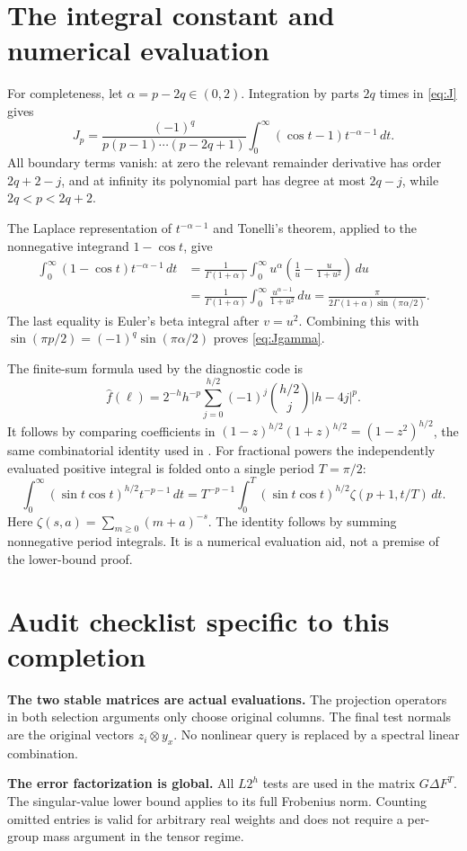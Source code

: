 \documentclass[11pt]{article}
\theoremstyle{remark}\newtheorem{remark}[theorem]{Remark}
\begin{document}
\section{The integral constant and numerical evaluation}\label{app:J}
For completeness, let $\alpha=p-2q\in(0,2)$. Integration by parts $2q$ times in \eqref{eq:J} gives
\[
 J_p=\frac{(-1)^q}{p(p-1)\cdots(p-2q+1)}
 \int_0^\infty(\cos t-1)t^{-\alpha-1}\,dt.
\]
All boundary terms vanish: at zero the relevant remainder derivative has order $2q+2-j$, and at infinity its polynomial part has degree at most $2q-j$, while $2q<p<2q+2$.

The Laplace representation of $t^{-\alpha-1}$ and Tonelli's theorem, applied to the nonnegative integrand $1-\cos t$, give
\begin{align*}
 \int_0^\infty(1-\cos t)t^{-\alpha-1}\,dt
 &=\frac1{\Gamma(1+\alpha)}
 \int_0^\infty u^{\alpha}\left(\frac1u-\frac{u}{1+u^2}\right)\,du\\
 &=\frac1{\Gamma(1+\alpha)}\int_0^\infty\frac{u^{\alpha-1}}{1+u^2}\,du
 =\frac\pi{2\Gamma(1+\alpha)\sin(\pi\alpha/2)}.
\end{align*}
The last equality is Euler's beta integral after $v=u^2$. Combining this with
$\sin(\pi p/2)=(-1)^q\sin(\pi\alpha/2)$ proves \eqref{eq:Jgamma}.

The finite-sum formula used by the diagnostic code is
\[
 \widehat f(\ell)=2^{-h}h^{-p}
 \sum_{j=0}^{h/2}(-1)^j\binom{h/2}{j}|h-4j|^p.
\]
It follows by comparing coefficients in
$(1-z)^{h/2}(1+z)^{h/2}=(1-z^2)^{h/2}$, the same combinatorial identity used in \cite{lww}. For fractional powers the independently evaluated positive integral is folded onto a single period $T=\pi/2$:
\[
 \int_0^\infty(\sin t\cos t)^{h/2}t^{-p-1}\,dt
 =T^{-p-1}\int_0^T(\sin t\cos t)^{h/2}
       \zeta(p+1,t/T)\,dt.
\]
Here $\zeta(s,a)=\sum_{m\ge0}(m+a)^{-s}$. The identity follows by summing nonnegative period integrals. It is a numerical evaluation aid, not a premise of the lower-bound proof.

\section{Audit checklist specific to this completion}
\textbf{The two stable matrices are actual evaluations.}
The projection operators in both selection arguments only choose original columns. The final test normals are the original vectors $z_i\otimes y_x$. No nonlinear query is replaced by a spectral linear combination.

\textbf{The error factorization is global.}
All $L2^h$ tests are used in the matrix $G\Delta F^T$. The singular-value lower bound applies to its full Frobenius norm. Counting omitted entries is valid for arbitrary real weights and does not require a per-group mass argument in the tensor regime.
\end{document}
